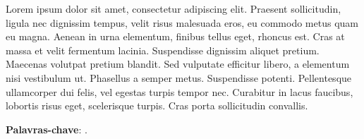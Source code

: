 %
%
%

\setlength{\absparsep}{18pt}
\begin{resumo}

Lorem ipsum dolor sit amet, consectetur adipiscing elit. Praesent sollicitudin,
ligula nec dignissim tempus, velit risus malesuada eros, eu commodo metus quam
eu magna. Aenean in urna elementum, finibus tellus eget, rhoncus est. Cras at
massa et velit fermentum lacinia. Suspendisse dignissim aliquet pretium.
Maecenas volutpat pretium blandit. Sed vulputate efficitur libero, a elementum
nisi vestibulum ut. Phasellus a semper metus. Suspendisse potenti. Pellentesque
ullamcorper dui felis, vel egestas turpis tempor nec. Curabitur in lacus
faucibus, lobortis risus eget, scelerisque turpis. Cras porta sollicitudin
convallis.

\textbf{Palavras-chave}: \imprimirpalavraschave.
\end{resumo}

